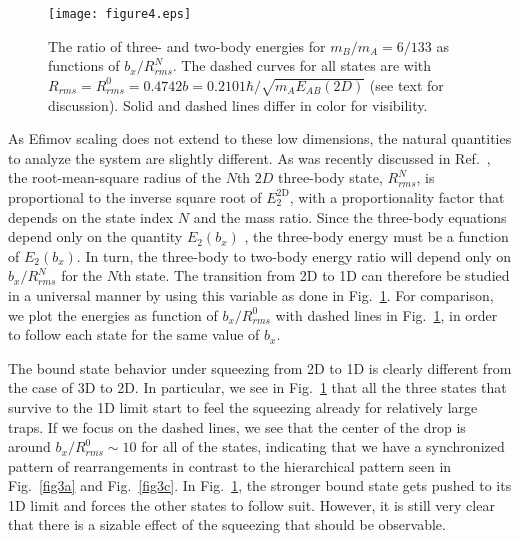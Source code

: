 \documentclass[twocolumn,showpacs,aps,prl,10pt]{revtex4}
\begin{document}
\begin{figure}[t]
\texttt{[image: figure4.eps]}
\caption{
The ratio of three- and two-body energies for 
$m_B/m_A = 6/133$ as functions of $b_x /R_{rms}^N$. 
The
dashed curves for all states are with $R_{rms}=R_{rms}^0 = 0.4742 b =
0.2101\hbar/\sqrt{m_AE_{AB}(2D)}$ (see text for discussion).
Solid and dashed lines differ in color for visibility. 
}
\label{fig3b}
\end{figure}

As Efimov scaling does not extend to these low dimensions, the natural
quantities to analyze the system are slightly different. As
was recently discussed in Ref.~\cite{san16}, the root-mean-square radius of
the $N$th $2D$ three-body state, $R_{rms}^N$, is proportional to the
inverse square root of $E_{2}^\textrm{2D}$, with a proportionality
factor that depends on the state index $N$ and the mass ratio. Since
the three-body equations depend only on the quantity $E_{2}(b_x)$
\cite{supmat}, the three-body energy must be a function of
$E_{2}(b_x)$. In turn, the three-body to two-body energy ratio will depend
only on $b_x/R_{rms}^N$ for the $N$th state. The transition from 2D to
1D can therefore be studied in a universal manner by using this
variable as done in Fig.~\ref{fig3b}.  For comparison, we plot the
energies as function of $b_x/R_{rms}^0$ with dashed lines in
Fig.~\ref{fig3b}, in order to follow each state for the same value of
$b_x$.



The bound state behavior under squeezing from 2D to 1D is 
clearly different from the case of 3D to 2D. In particular, 
we see in Fig.~\ref{fig3b} that all the three states that 
survive to the 1D limit start to feel the squeezing already 
for relatively large traps. If we focus on the 
dashed lines, we see that the center of the drop is around 
$b_x/R_{rms}^0\sim 10$ for all of the states, indicating 
that we have a synchronized pattern of rearrangements in 
contrast to the hierarchical pattern seen in Fig.~\ref{fig3a} 
and Fig.~\ref{fig3c}. In Fig.~\ref{fig3b}, the stronger 
bound state gets pushed to its 1D limit and forces the 
other states to follow suit. However, it is still very 
clear that there is a sizable effect of the squeezing 
that should be observable.
\end{document}

